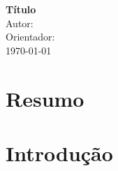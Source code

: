 \documentclass[12pt,a4paper, brazil]{article}
\begin{document}
\begin{center}
{\textbf {\huge Título}}\\[5mm]
{\large Autor: } \\[2mm]
{\large Orientador: } \\[5mm]
\today\\[5mm] %
\end{center}


\section*{Resumo}

\section{Introdução}



\printbibliography
\end{document}
